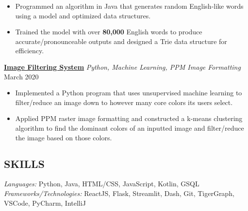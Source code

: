 \documentclass[11pt]{res}
\begin{document}
\begin{footnotesize}
\begin{resume}
\begin{itemize}
\item Programmed an algorithm in Java that generates random English-like words using a model and optimized data structures.  
\vspace{-2.5mm}
\item Trained the model with over \textbf{80,000} English words to produce accurate/pronounceable outputs and designed a Trie data structure for efficiency.
\end{itemize}
\vspace{-3.25mm}
\href{https://github.com/CharlesShi12/ImageFilters}{\textbf{Image Filtering System}} {\sl Python, Machine Learning, PPM Image Formatting} \hfill March 2020\vspace{-4.75mm}
\begin{itemize} \itemsep -2pt
\item Implemented a Python program that uses unsupervised machine learning to filter/reduce an image down to however many core colors its users select.
\vspace{1mm}
\item Applied PPM raster image formatting and constructed a k-means clustering algorithm to find the dominant colors of an inputted image and filter/reduce the image based on those colors. 
\end{itemize}
\begin{small}
\section{SKILLS}
\end{small} 
\vspace{.5mm}
{\sl Languages:} 
Python, Java, HTML/CSS, JavaScript, Kotlin, GSQL \\
{\sl Frameworks/Technologies:} ReactJS, Flask, Streamlit, Dash, Git, TigerGraph, VSCode, PyCharm, IntelliJ

\end{resume}
\end{footnotesize}
\end{document}
